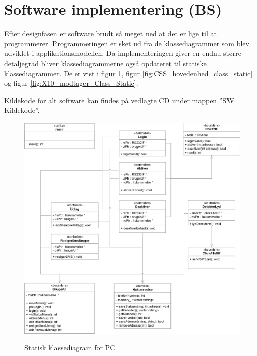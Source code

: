 \section{Software implementering (BS)}

Efter designfasen er software brudt så meget ned at det er lige til at programmerer.
Programmeringen er sket ud fra de klassediagrammer som blev udviklet i applikationsmodellen.
Da implementeringen giver en endnu større detaljegrad bliver klassediagrammerne også opdateret til statiske klassediagrammer. De er vist i figur \ref{fig:PC_class_static}, figur \ref{fig:CSS_hovedenhed_class_static} og figur \ref{fig:X10_modtager_Class_Static}.

Kildekode for alt software kan findes på vedlagte CD under mappen ''SW Kildekode''.

\begin{figure}[htb]
  \centering
  {
    \includegraphics[width=\textwidth]	
      {billeder/uml/PC_Class_static}
  }
  \caption{Statisk klassediagram for PC}
  \label{fig:PC_class_static}
\end{figure}

